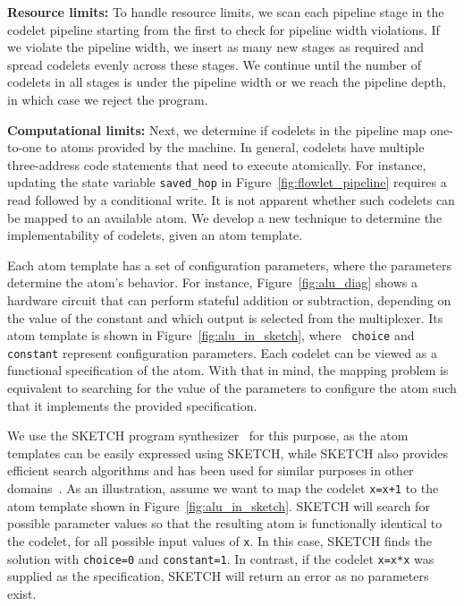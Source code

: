 \textbf{Resource limits:} To handle resource limits, we scan each pipeline
stage in the codelet pipeline starting from the first to check for pipeline
width violations.  If we violate the pipeline width, we insert as many new
stages as required and spread codelets evenly across these stages.  We continue
until the number of codelets in all stages is under the pipeline width or we
reach the pipeline depth, in which case we reject the program.

\textbf{Computational limits:} Next, we determine if codelets in the pipeline
map one-to-one to atoms provided by the \absmachine machine. In general,
codelets have multiple three-address code statements that need to execute
atomically. For instance, updating the state variable \texttt{saved\_hop} in
Figure~\ref{fig:flowlet_pipeline} requires a read followed by a conditional
write.  It is not apparent whether such codelets can be mapped to an available
atom. We develop a new technique to determine the implementability of codelets,
given an atom template.

Each atom template has a set of configuration parameters, where the parameters
determine the atom's behavior.  For instance, Figure~\ref{fig:alu_diag} shows a
hardware circuit that can perform stateful addition or subtraction, depending
on the value of the constant and which output is selected from the multiplexer.
Its atom template is shown in Figure~\ref{fig:alu_in_sketch}, where {\tt
choice} and {\tt constant} represent configuration parameters.  Each codelet
can be viewed as a functional specification of the atom.  With that in mind,
the mapping problem is equivalent to searching for the value of the parameters
to configure the atom such that it implements the provided specification.

We use the SKETCH program synthesizer~\cite{sketch_asplos} for this purpose, as
the atom templates can be easily expressed using SKETCH, while SKETCH also
provides efficient search algorithms and has been used for similar purposes in
other domains~\cite{bitstreaming, lifejoin, qbs, chlorophyll}.  As an
illustration, assume we want to map the codelet {\tt x=x+1} to the atom
template shown in Figure~\ref{fig:alu_in_sketch}. SKETCH will search for
possible parameter values so that the resulting atom is functionally identical
to the codelet, for all possible input values of {\tt x}.  In this case, SKETCH
finds the solution with {\tt choice=0} and {\tt constant=1}.  In contrast, if
the codelet {\tt x=x*x} was supplied as the specification, SKETCH will return
an error as no parameters exist.


